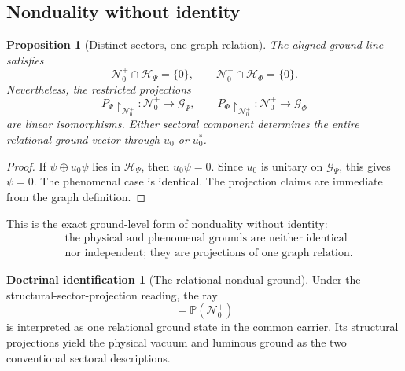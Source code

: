 \documentclass[11pt,reqno]{scrartcl}
\newcommand{\scrHP}{\mathscr H_{\Psi}}
\newcommand{\scrHF}{\mathscr H_{\Phi}}
\newcommand{\PP}{P_{\Psi}}
\newcommand{\PF}{P_{\Phi}}
\newcommand{\GzeroP}{\mathscr G_{\Psi}}
\newcommand{\GzeroF}{\mathscr G_{\Phi}}
\newcommand{\uzero}{u_{0}}
\newcommand{\NzeroPlus}{\mathscr N_{0}^{+}}
\newcommand{\ket}[1]{\lvert #1\rangle}
\newcommand{\restr}[2]{#1\!\upharpoonright_{#2}}
\newcommand{\projective}[1]{\mathbb P\!\left(#1\right)}
\theoremstyle{plain}
\newtheorem{proposition}[proposition]{Proposition}
\theoremstyle{definition}
\newtheorem{identification}[identification]{Doctrinal identification}
\theoremstyle{remark}
\begin{document}
\subsection{Nonduality without identity}

\begin{proposition}[Distinct sectors, one graph relation]
\label{prop:nonduality-without-identity}
The aligned ground line satisfies
\begin{equation}
  \NzeroPlus\cap\scrHP=\{0\},
  \qquad
  \NzeroPlus\cap\scrHF=\{0\}.
  \label{eq:N0-trivial-sector-intersections}
\end{equation}
Nevertheless, the restricted projections
\begin{equation}
  \restr{\PP}{\NzeroPlus}:\NzeroPlus\to\GzeroP,
  \qquad
  \restr{\PF}{\NzeroPlus}:\NzeroPlus\to\GzeroF
  \label{eq:N0-sector-projection-isomorphisms}
\end{equation}
are linear isomorphisms.  Either sectoral component determines the entire
relational ground vector through \(\uzero\) or \(\uzero^*\).
\end{proposition}

\begin{proof}
If \(\psi\oplus\uzero\psi\) lies in \(\scrHP\), then
\(\uzero\psi=0\).  Since \(\uzero\) is unitary on \(\GzeroP\), this gives
\(\psi=0\).  The phenomenal case is identical.  The projection claims are
immediate from the graph definition.
\end{proof}

This is the exact ground-level form of nonduality without identity:
\begin{equation}
  \boxed{
  \begin{aligned}
  &\text{the physical and phenomenal grounds are neither identical}\\
  &\text{nor independent; they are projections of one graph relation.}
  \end{aligned}}
  \label{eq:nonduality-without-identity-slogan}
\end{equation}

\begin{identification}[The relational nondual ground]
\label{id:relational-nondual-ground}
Under the structural-sector-projection reading, the ray
\begin{equation}
  [\ket{\Xi_0^+}]=\projective{\NzeroPlus}
  \label{eq:relational-ground-ray}
\end{equation}
is interpreted as one relational ground state in the common carrier.  Its
structural projections yield the physical vacuum and luminous ground as the
two conventional sectoral descriptions.
\end{identification}
\end{document}
